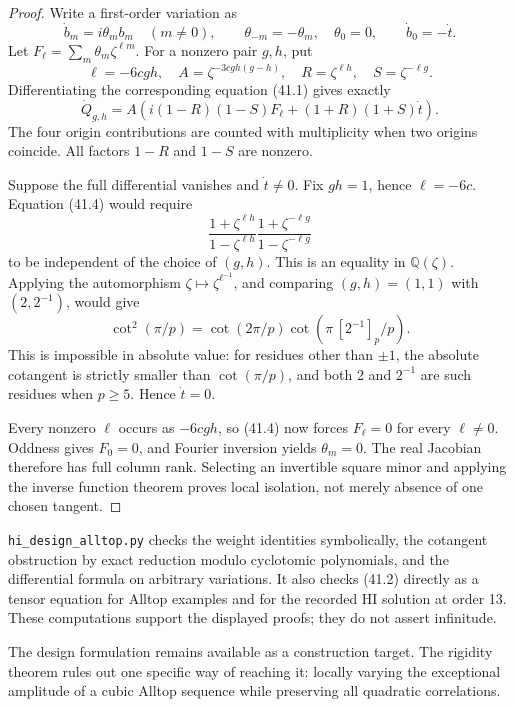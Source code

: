 \documentclass[11pt,reqno]{amsart}
\theoremstyle{plain}
\begin{document}
\begin{proof}
Write a first-order variation as
\[
 \dot b_m=i\theta_m b_m\quad(m\ne0),\qquad
 \theta_{-m}=-\theta_m,\quad\theta_0=0,\qquad
 \dot b_0=-\dot t.
\]
Let \(F_\ell=\sum_m\theta_m\zeta^{\ell m}\). For a nonzero
pair \(g,h\), put
\[
 \ell=-6cgh,\quad A=\zeta^{-3cgh(g-h)},\quad
 R=\zeta^{\ell h},\quad S=\zeta^{-\ell g}.
\]
Differentiating the corresponding equation (41.1) gives exactly
\begin{equation*}
 \dot Q_{g,h}=A\left(i(1-R)(1-S)F_\ell
                         +(1+R)(1+S)\dot t\right). \tag{41.4}
\end{equation*}
The four origin contributions are counted with multiplicity when
two origins coincide. All factors \(1-R\) and \(1-S\) are nonzero.

Suppose the full differential vanishes and \(\dot t\ne0\).
Fix \(gh=1\), hence \(\ell=-6c\). Equation (41.4) would require
\[
 \frac{1+\zeta^{\ell h}}{1-\zeta^{\ell h}}
 \frac{1+\zeta^{-\ell g}}{1-\zeta^{-\ell g}}
\]
to be independent of the choice of \((g,h)\). This is an equality
in \(\mathbb Q(\zeta)\). Applying the automorphism
\(\zeta\mapsto\zeta^{\ell^{-1}}\), and comparing
\((g,h)=(1,1)\) with \((2,2^{-1})\), would give
\[
 \cot^2(\pi/p)=\cot(2\pi/p)\cot(\pi\,[2^{-1}]_p/p).
\]
This is impossible in absolute value: for residues other than
\(\pm1\), the absolute cotangent is strictly smaller than
\(\cot(\pi/p)\), and both 2 and \(2^{-1}\) are such residues
when \(p\ge5\). Hence \(\dot t=0\).

Every nonzero \(\ell\) occurs as \(-6cgh\), so (41.4) now
forces \(F_\ell=0\) for every \(\ell\ne0\). Oddness gives
\(F_0=0\), and Fourier inversion yields \(\theta_m=0\).
The real Jacobian therefore has full column rank. Selecting an
invertible square minor and applying the inverse function theorem
proves local isolation, not merely absence of one chosen tangent.
\end{proof}

\texttt{hi\_\allowbreak design\_\allowbreak alltop.py} checks the weight identities symbolically,
the cotangent obstruction by exact reduction modulo cyclotomic
polynomials, and the differential formula on arbitrary variations.
It also checks (41.2) directly as a tensor equation for Alltop examples
and for the recorded HI solution at order 13. These computations
support the displayed proofs; they do not assert infinitude.

The design formulation remains available as a construction target.
The rigidity theorem rules out one specific way of reaching it:
locally varying the exceptional amplitude of a cubic Alltop sequence
while preserving all quadratic correlations.
\end{document}
